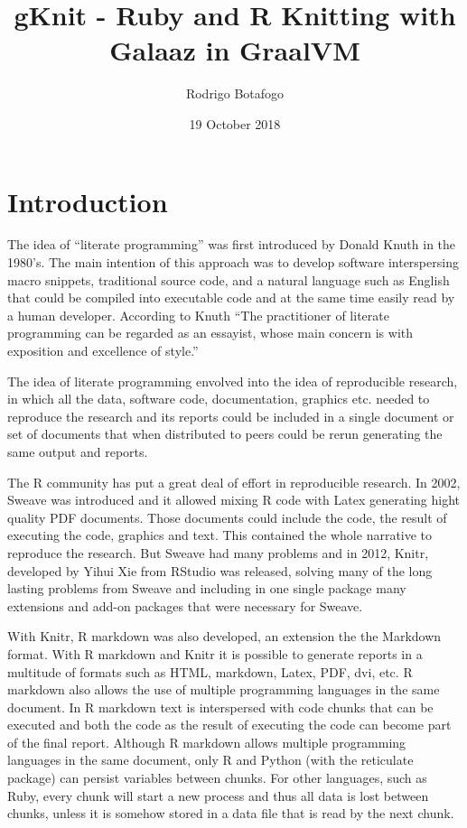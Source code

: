 \documentclass[]{article}
\title{gKnit - Ruby and R Knitting with Galaaz in GraalVM}
\author{Rodrigo Botafogo}
\date{19 October 2018}
\begin{document}
\maketitle

\section{Introduction}\label{introduction}

The idea of ``literate programming'' was first introduced by Donald
Knuth in the 1980's. The main intention of this approach was to develop
software interspersing macro snippets, traditional source code, and a
natural language such as English that could be compiled into executable
code and at the same time easily read by a human developer. According to
Knuth ``The practitioner of literate programming can be regarded as an
essayist, whose main concern is with exposition and excellence of
style.''

The idea of literate programming envolved into the idea of reproducible
research, in which all the data, software code, documentation, graphics
etc. needed to reproduce the research and its reports could be included
in a single document or set of documents that when distributed to peers
could be rerun generating the same output and reports.

The R community has put a great deal of effort in reproducible research.
In 2002, Sweave was introduced and it allowed mixing R code with Latex
generating hight quality PDF documents. Those documents could include
the code, the result of executing the code, graphics and text. This
contained the whole narrative to reproduce the research. But Sweave had
many problems and in 2012, Knitr, developed by Yihui Xie from RStudio
was released, solving many of the long lasting problems from Sweave and
including in one single package many extensions and add-on packages that
were necessary for Sweave.

With Knitr, R markdown was also developed, an extension the the Markdown
format. With R markdown and Knitr it is possible to generate reports in
a multitude of formats such as HTML, markdown, Latex, PDF, dvi, etc. R
markdown also allows the use of multiple programming languages in the
same document. In R markdown text is interspersed with code chunks that
can be executed and both the code as the result of executing the code
can become part of the final report. Although R markdown allows multiple
programming languages in the same document, only R and Python (with the
reticulate package) can persist variables between chunks. For other
languages, such as Ruby, every chunk will start a new process and thus
all data is lost between chunks, unless it is somehow stored in a data
file that is read by the next chunk.
\end{document}
